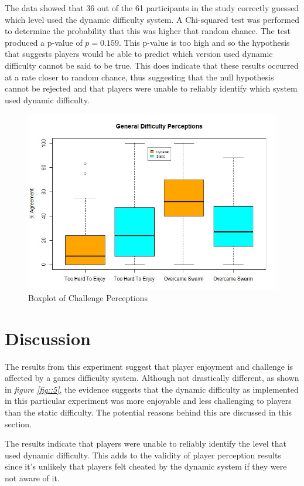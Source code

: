 \documentclass[journal]{IEEEtran}
\begin{document}
The data showed that 36 out of the 61 participants in the study correctly guessed which level used the dynamic difficulty system. A Chi-squared test was performed to determine the probability that this was higher that random chance. The test produced a p-value of $p = 0.159$. This p-value is too high and so the hypothesis that suggests players would be able to predict which version used dynamic difficulty cannot be said to be true. This does indicate that these results occurred at a rate closer to random chance, thus suggesting that the null hypothesis cannot be rejected and that players were unable to reliably identify which system used dynamic difficulty. 



\begin{figure}[h]
	\includegraphics[width=1.0\linewidth]{difficultyperceptions.jpg}
	\caption{Boxplot of Challenge Perceptions}
	\label{fig::7}
\end{figure} 

\section{Discussion}
The results from this experiment suggest that player enjoyment and challenge is affected by a games difficulty system. Although not drastically different, as shown in \textit{figure \ref{fig::5}}, the evidence suggests that the dynamic difficulty as implemented in this particular experiment was more enjoyable and less challenging to players than the static difficulty. The potential reasons behind this are discussed in this section.

The results indicate that players were unable to reliably identify the level that used dynamic difficulty. This adds to the validity of player perception results since it's unlikely that players felt cheated by the dynamic system if they were not aware of it. 
\end{document}
